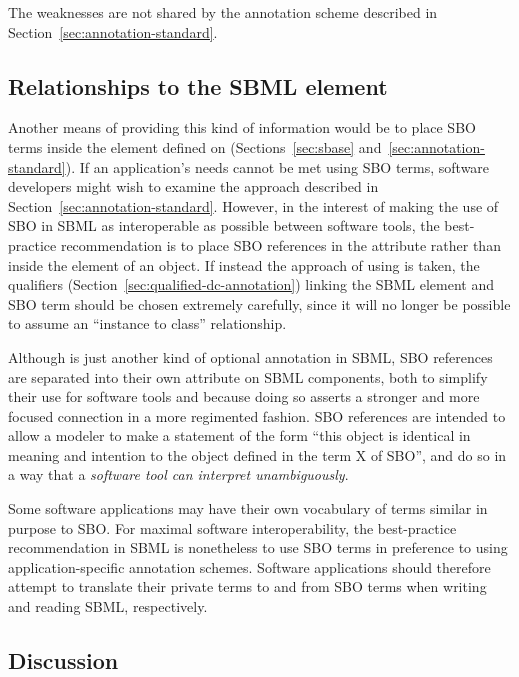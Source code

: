 The weaknesses are not shared by the annotation scheme described
in Section~\ref{sec:annotation-standard}.  


\subsection{Relationships to the SBML  element}

Another means of providing this kind of information would be to
place SBO terms inside the  element
defined on \SBase (Sections~\ref{sec:sbase} and~\ref{sec:annotation-standard}).
If an application's needs cannot be met using SBO terms, software developers might wish to
examine the approach described in Section~\ref{sec:annotation-standard}. 
However, in the interest of making the use of SBO in SBML
as interoperable as possible between software tools, the best-practice
recommendation is to place SBO references in the 
attribute rather than inside the 
element of an object. If instead the approach of using  is taken, the qualifiers (Section~\ref{sec:qualified-dc-annotation}) linking the SBML element and SBO term should be chosen extremely carefully, since it will no longer be possible to assume an ``instance to class'' relationship. 

Although  is just another kind of optional
annotation in SBML, SBO references are separated into
their own attribute on SBML components, both to simplify their use
for software tools and because doing so asserts a stronger and
more focused connection in a more regimented fashion.  SBO
references are intended to allow a modeler to make a statement of
the form ``this object is identical in meaning and intention to
the object defined in the term X of SBO'', and do so in a way
that a \emph{software tool can interpret unambiguously}.

Some software applications may have their own vocabulary of terms
similar in purpose to SBO.  For maximal software interoperability,
the best-practice recommendation in SBML is nonetheless to use SBO
terms in preference to using application-specific annotation
schemes.  Software applications should therefore attempt to
translate their private terms to and from SBO terms when writing
and reading SBML, respectively.


\subsection{Discussion}


